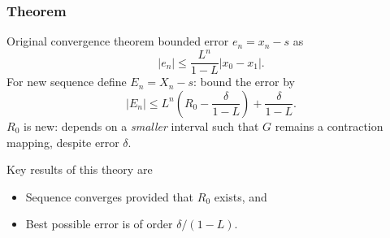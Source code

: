 \documentclass{beamer}
\begin{document}
\begin{frame}
  \frametitle{Theorem}

  Original convergence theorem bounded error $e_n = x_n - s$ as
  \begin{equation*}
    |e_n| \leq \frac{L^n}{1 - L} |x_0 - x_1|.
  \end{equation*} \pause
  For new sequence define $E_n = X_n - s$: bound the error by
  \begin{equation*}
    |E_n| \leq L^n \left(R_0 - \frac{\delta}{1-L} \right) +
    \frac{\delta}{1-L}.
  \end{equation*}
  $R_0$ is new: depends on a \emph{smaller} interval such
  that $G$ remains a contraction mapping, despite error $\delta$.
  \pause

  \vspace{1ex}

  Key results of this theory are
  \begin{itemize}
  \item Sequence converges provided that $R_0$ exists, and
  \item Best possible error is of order $\delta / (1 - L)$.
  \end{itemize}

\end{frame}
\end{document}
